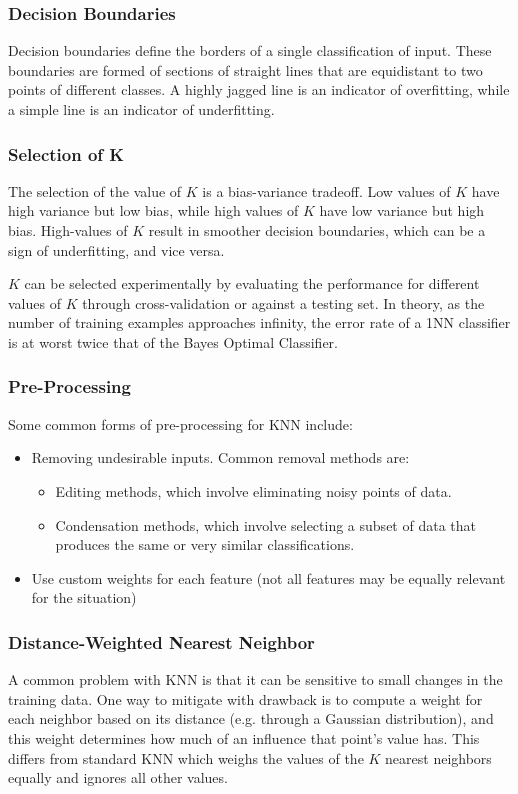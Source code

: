 \documentclass[12pt,titlepage]{article}
\begin{document}
      \subsubsection{Decision Boundaries}
        Decision boundaries define the borders of a single classification of input. These boundaries are formed of sections of straight lines that are equidistant
        to two points of different classes. A highly jagged line is an indicator of overfitting, while a simple line is an indicator of underfitting.

      \subsubsection{Selection of K}
        The selection of the value of $K$ is a bias-variance tradeoff. Low values of $K$ have high variance but low bias, while high values of $K$ have low variance
        but high bias. High-values of $K$ result in smoother decision boundaries, which can be a sign of underfitting, and vice versa.

        $K$ can be selected experimentally by evaluating the performance for different values of $K$ through cross-validation or against a testing set. In theory, as
        the number of training examples approaches infinity, the error rate of a 1NN classifier is at worst twice that of the Bayes Optimal Classifier.

      \subsubsection{Pre-Processing}
        Some common forms of pre-processing for KNN include:
        \begin{itemize}
          \item Removing undesirable inputs. Common removal methods are:
            \begin{itemize}
              \item Editing methods, which involve eliminating noisy points of data.
              \item Condensation methods, which involve selecting a subset of data that produces the same or very similar classifications.
            \end{itemize}
          \item Use custom weights for each feature (not all features may be equally relevant for the situation)
        \end{itemize}

      \subsubsection{Distance-Weighted Nearest Neighbor}
        A common problem with KNN is that it can be sensitive to small changes in the training data. One way to mitigate with drawback is to compute a weight for
        each neighbor based on its distance (e.g. through a Gaussian distribution), and this weight determines how much of an influence that point's value has.
        This differs from standard KNN which weighs the values of the $K$ nearest neighbors equally and ignores all other values.
\end{document}
